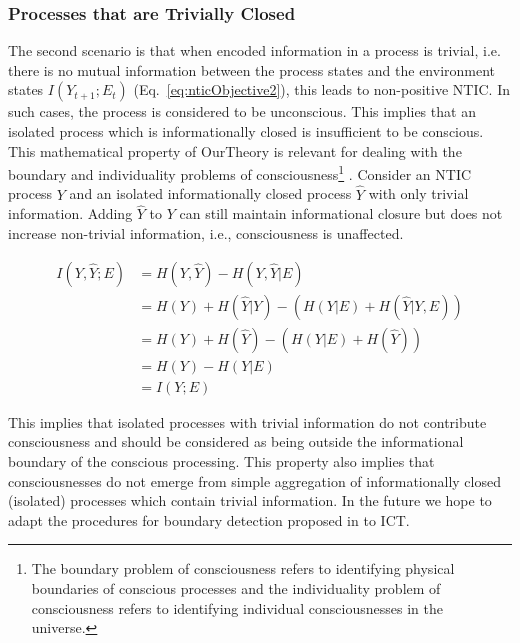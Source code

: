 \documentclass[utf8]{article}
\begin{document}
            \subsubsection*{Processes that are Trivially Closed}
                The second scenario is that when encoded information in a process is trivial, i.e. there is no mutual information between the process states and the environment states $I(Y_{t+1};E_{t})$ (Eq.~\ref{eq:nticObjective2}), this leads to non-positive NTIC. In such cases, the process is considered to be unconscious. This implies that an isolated process which is informationally closed is insufficient to be conscious. 
                This mathematical property of \ac{OurTheory} 
                is relevant for 
                dealing with 
                the boundary and individuality problems of consciousness\footnote{The boundary problem of consciousness refers to identifying physical boundaries of conscious processes and the individuality problem of consciousness refers to identifying individual consciousnesses in the universe.}
                \citep{Raymont2006-RAYUOC}. Consider an NTIC process $Y$ and an isolated informationally closed process $\hat{Y}$ with only trivial information. Adding $\hat{Y}$ to $Y$ can still maintain informational closure but does not increase non-trivial information, i.e.,  consciousness is unaffected. 
                
    			\begin{equation}
    			    \begin{aligned}
                        I(Y,\hat{Y};E) & = H(Y,\hat{Y}) - H(Y,\hat{Y}|E) \\
                                       & = H(Y) + H(\hat{Y}|Y) - (H(Y|E)+H(\hat{Y}|Y,E)) \\
                                       & = H(Y) + H(\hat{Y}) - (H(Y|E)+H(\hat{Y})) \\
                                       & = H(Y) - H(Y|E)\\
                                       & = I(Y;E)				
    				\end{aligned}
    			\end{equation}
                
                This implies that isolated processes with trivial information do not contribute consciousness and should be considered as being outside the informational boundary of the conscious processing. 
                This property also implies that consciousnesses do not emerge from simple aggregation of informationally closed (isolated) processes which contain trivial information.
                In the future we hope to adapt the procedures for boundary detection proposed in \citet{krakauer2014information,krakauer2020information} to ICT.
                
\end{document}
